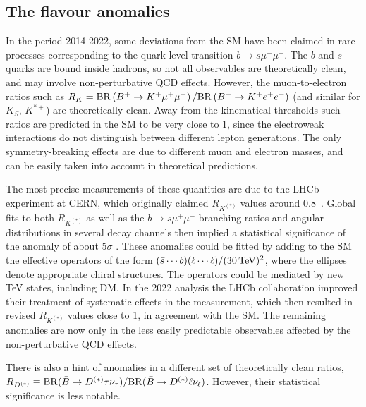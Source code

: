  

\subsection{The flavour anomalies}\label{sec:RK}
In the period 2014-2022, some deviations from the SM have been claimed in 
rare processes corresponding to the quark level transition $b\to s \mu^+\mu^-$. 
The $b$ and $s$ quarks are bound inside hadrons, so not all observables are theoretically clean, and may involve non-perturbative QCD effects. 
However, the muon-to-electron ratios such as
$R_K ={\rm BR} \left ( B^+ \to K^+ \mu ^+ \mu ^-\right )/{\rm BR} \left ( B^+ \to K^+ e^+ e^-\right )$
(and similar for $K_S$, $K^{*+}$) are theoretically clean. 
Away from the kinematical thresholds  such ratios are predicted in the SM to be very close to 1, 
since the electroweak interactions do not distinguish between different lepton generations. 
The only symmetry-breaking effects are due to different muon and electron masses, 
and can be easily taken into account in theoretical predictions. 



The most precise measurements of these quantities are due to the LHCb experiment at CERN,
which originally claimed $R_{K^{(*)}}$ values around $0.8$~\cite{RKanomaly}. 
Global fits to both $R_{K^{(*)}}$ as well as the $b\to s \mu^+\mu^-$ branching ratios and angular distributions in several decay channels then implied 
a statistical significance of the anomaly of about $ 5\sigma$ \cite{RKfits}. 
These anomalies could be fitted by adding to the SM the effective operators of the form
$(\bar s \cdots  b)(\bar\ell \cdots \ell)/(30\,{\rm TeV})^2$, where the ellipses denote appropriate chiral structures.
The operators could be mediated by new TeV  states, including DM.  In the 2022 analysis the LHCb collaboration improved their treatment of systematic effects in the measurement, which then resulted in revised $R_{K^{(*)}}$ values close to 1, in agreement with the SM. 
The remaining anomalies are now only in the less easily predictable observables affected by the non-perturbative QCD effects.



There is also a hint of anomalies in a different set of theoretically clean ratios, $R_{D^{(*)}}\equiv {\rm BR}(\bar B \to D^{(*)}\tau\bar\nu_\tau)/{\rm BR}(\bar B \to D^{(*)}\ell\bar\nu_\ell)$. However, their statistical significance is less notable. 




